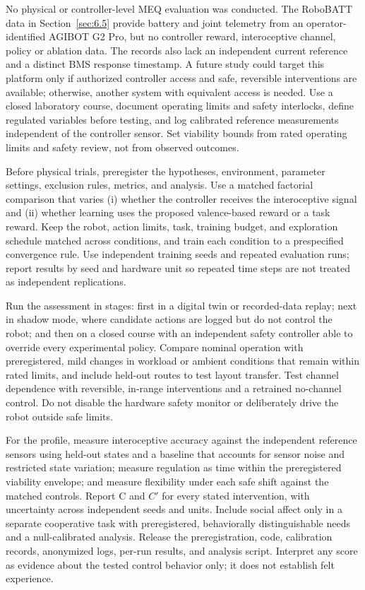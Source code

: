 \documentclass[twoside,11pt]{article}
\begin{document}
No physical or controller-level MEQ evaluation was conducted. The RoboBATT data in Section~\ref{sec:6.5} provide battery and joint telemetry from an operator-identified AGIBOT G2 Pro, but no controller reward, interoceptive channel, policy or ablation data. The records also lack an independent current reference and a distinct BMS response timestamp. A future study could target this platform only if authorized controller access and safe, reversible interventions are available; otherwise, another system with equivalent access is needed. Use a closed laboratory course, document operating limits and safety interlocks, define regulated variables before testing, and log calibrated reference measurements independent of the controller sensor. Set viability bounds from rated operating limits and safety review, not from observed outcomes.

Before physical trials, preregister the hypotheses, environment, parameter settings, exclusion rules, metrics, and analysis. Use a matched factorial comparison that varies (i) whether the controller receives the interoceptive signal and (ii) whether learning uses the proposed valence-based reward or a task reward. Keep the robot, action limits, task, training budget, and exploration schedule matched across conditions, and train each condition to a prespecified convergence rule. Use independent training seeds and repeated evaluation runs; report results by seed and hardware unit so repeated time steps are not treated as independent replications.

Run the assessment in stages: first in a digital twin or recorded-data replay; next in shadow mode, where candidate actions are logged but do not control the robot; and then on a closed course with an independent safety controller able to override every experimental policy. Compare nominal operation with preregistered, mild changes in workload or ambient conditions that remain within rated limits, and include held-out routes to test layout transfer. Test channel dependence with reversible, in-range interventions and a retrained no-channel control. Do not disable the hardware safety monitor or deliberately drive the robot outside safe limits.

For the profile, measure interoceptive accuracy against the independent reference sensors using held-out states and a baseline that accounts for sensor noise and restricted state variation; measure regulation as time within the preregistered viability envelope; and measure flexibility under each safe shift against the matched controls. Report C and $C'$ for every stated intervention, with uncertainty across independent seeds and units. Include social affect only in a separate cooperative task with preregistered, behaviorally distinguishable needs and a null-calibrated analysis. Release the preregistration, code, calibration records, anonymized logs, per-run results, and analysis script. Interpret any score as evidence about the tested control behavior only; it does not establish felt experience.
\end{document}
